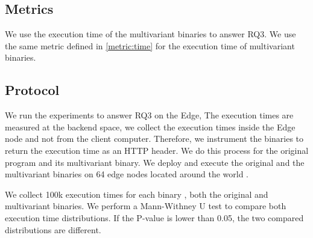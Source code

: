 \subsection*{Metrics}

We use the execution time of the multivariant binaries to answer RQ3. We use the same metric defined in \autoref{metric:time} for the execution time of multivariant binaries.

\subsection*{Protocol}


We run the experiments to answer RQ3 on the Edge,  
The execution times are measured at the backend space, \ie we collect the execution times inside the Edge node and not from the client computer. Therefore, we instrument the binaries to return the execution time as an HTTP header. We do this process for the original program and its multivariant binary. We deploy and execute the original and the multivariant binaries on 64 edge nodes located around the world .


We collect 100k execution times for each binary , both the original and multivariant binaries.
We perform a Mann-Withney U test \cite{mann1947} to compare both execution time distributions. 
If the P-value is lower than 0.05, the two compared distributions are different.